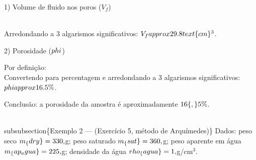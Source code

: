 \documentclass[11pt,a4paper]{article}
\begin{document}
\begin{enumerate}
{1) Volume de fluido nos poros ($V_f$)

\\[
$V_{f}$ = \\frac\{m_\{sat\}-m_\{dry\}\}\{\\$rho_{o}$\} = \\frac\{130-105\}\{0.84\} = \\frac\{25\}\{0.84\} \\approx 29.7619\\ \\text\{cm\}^3
\\]

Arredondando a 3 algarismos significativos: $V_f \\approx 29.8\\ \\text\{cm\}^3$.

2) Porosidade ($\\phi$)

Por definição:
\\[
\\phi = \\frac\{$V_{p}$\}\{$V_{t}$\} = \\frac\{$V_{f}$\}\{V_\{tot\}\} = \\frac\{29.7619\}\{180\} \\approx 0.1653439 \\approx 0.165
\\]

Convertendo para percentagem e arredondando a 3 algarismos significativos: $\\phi \\approx 16.5\\\%$.

Conclusão: a porosidade da amostra é aproximadamente $16\{,\}5\\\%$.

\\subsubsection\{Exemplo 2 — (Exercício 5, método de Arquímedes)\}
Dados: peso seco $m_\{dry\}=330\\,$g; peso saturado $m_\{sat\}=360\\,$g; peso aparente em água $m_\{ap\\_agua\}=225\\,$g; densidade da água $\\rho_\{agua\}=1\\,$g/cm$^3$.

}
\end{enumerate}
\end{document}
